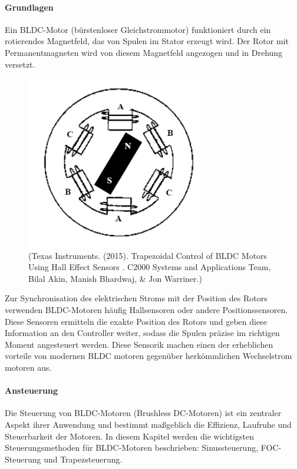 \documentclass[paper=a4,11pt]{scrreprt}
\begin{document}
\paragraph{Grundlagen}
Ein BLDC-Motor (bürstenloser Gleichstrommotor) funktioniert durch ein rotierendes Magnetfeld, das von Spulen im Stator erzeugt wird. Der Rotor mit Permanentmagneten wird von diesem Magnetfeld angezogen und in Drehung versetzt.\\
\begin{figure}[ht]
\begin{center}
\includegraphics[width=8cm]{Bilder/Motor.PNG}
\caption{(Texas Instruments. (2015). Trapezoidal Control of BLDC Motors Using Hall Effect Sensors . C2000 Systems and Applications Team, Bilal Akin, Manish Bhardwaj, \& Jon Warriner.)}
\label{motor}
\end{center}
\end{figure}

Zur Synchronisation des elektrischen Stroms mit der Position des Rotors verwenden BLDC-Motoren häufig Hallsensoren oder andere Positionssensoren.
Diese Sensoren ermitteln die exakte Position des Rotors und geben diese Information an den Controller weiter, sodass die Spulen präzise im richtigen Moment angesteuert werden. Diese Sensorik machen einen der erheblichen vorteile von modernen BLDC motoren gegenüber herkömmlichen Wechselstrom motoren aus. 
\newpage
\paragraph{Ansteuerung}
Die Steuerung von BLDC-Motoren (Brushless DC-Motoren) ist ein zentraler Aspekt ihrer Anwendung und bestimmt maßgeblich die Effizienz, Laufruhe und Steuerbarkeit der Motoren. In diesem Kapitel werden die wichtigsten Steuerungsmethoden für BLDC-Motoren beschrieben: Sinussteuerung, FOC-Steuerung und Trapezsteuerung.
\end{document}
